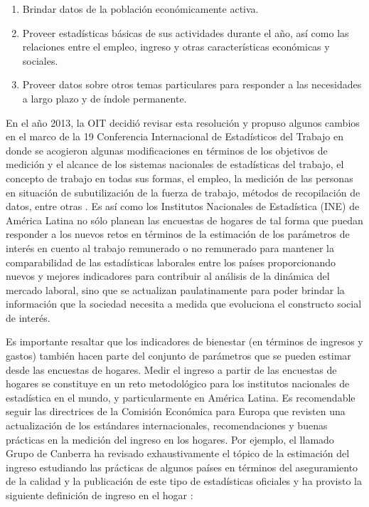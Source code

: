 \begin{enumerate}
\def\labelenumi{\arabic{enumi}.}
\tightlist
\item
  Brindar datos de la población económicamente activa.
\item
  Proveer estadísticas básicas de sus actividades durante el año, así como las relaciones entre el empleo, ingreso y otras características económicas y sociales.
\item
  Proveer datos sobre otros temas particulares para responder a las necesidades a largo plazo y de índole permanente.
\end{enumerate}

En el año 2013, la OIT decidió revisar esta resolución y propuso algunos cambios en el marco de la 19 Conferencia Internacional de Estadísticos del Trabajo en donde se acogieron algunas modificaciones en términos de los objetivos de medición y el alcance de los sistemas nacionales de estadísticas del trabajo, el concepto de trabajo en todas sus formas, el empleo, la medición de las personas en situación de subutilización de la fuerza de trabajo, métodos de recopilación de datos, entre otras \citep{OIT_2013}. Es así como los Institutos Nacionales de Estadística (INE) de América Latina no sólo planean las encuestas de hogares de tal forma que puedan responder a los nuevos retos en términos de la estimación de los parámetros de interés en cuento al trabajo remunerado o no remunerado para mantener la comparabilidad de las estadísticas laborales entre los países proporcionando nuevos y mejores indicadores para contribuir al análisis de la dinámica del mercado laboral, sino que se actualizan paulatinamente para poder brindar la información que la sociedad necesita a medida que evoluciona el constructo social de interés.

Es importante resaltar que los indicadores de bienestar (en términos de ingresos y gastos) también hacen parte del conjunto de parámetros que se pueden estimar desde las encuestas de hogares. Medir el ingreso a partir de las encuestas de hogares se constituye en un reto metodológico para los institutos nacionales de estadística en el mundo, y particularmente en América Latina. Es recomendable seguir las directrices de la Comisión Económica para Europa que revisten una actualización de los estándares internacionales, recomendaciones y buenas prácticas en la medición del ingreso en los hogares. Por ejemplo, el llamado Grupo de Canberra ha revisado exhaustivamente el tópico de la estimación del ingreso estudiando las prácticas de algunos países en términos del aseguramiento de la calidad y la publicación de este tipo de estadísticas oficiales y ha provisto la siguiente definición de ingreso en el hogar \citep{United-Nations_2011}:

